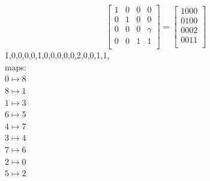 $$
\left[
\begin{array}{*{4}{r}}
1 & 0 & 0 & 0\\
0 & 1 & 0 & 0\\
0 & 0 & 0 & \gamma \\
0 & 0 & 1 & 1\\
\end{array}
\right]
=
\left[
\begin{array}{c}
1000\\
0100\\
0002\\
0011\\
\end{array}
\right]
$$
1,0,0,0,0,1,0,0,0,0,0,2,0,0,1,1,\\
maps: \\
$0 \mapsto 8$\\
$8 \mapsto 1$\\
$1 \mapsto 3$\\
$6 \mapsto 5$\\
$4 \mapsto 7$\\
$3 \mapsto 4$\\
$7 \mapsto 6$\\
$2 \mapsto 0$\\
$5 \mapsto 2$\\
